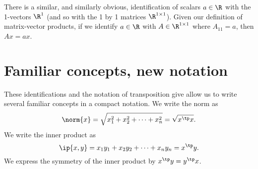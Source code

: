There is a similar, and similarly obvious, identification of scalars $a \in \R$ with the 1-vectors $\R ^{1}$ (and so with the 1 by 1 matrices $\R ^{1 \times  1}$).
Given our definition of matrix-vector products, if we identify $a \in \R $ with $A \in \R^{1 \times  1}$ where $A_{11} = a$, then $Ax = ax$.

\section*{Familiar concepts, new notation}

These identifications and the notation of transposition give allow us to write several familiar concepts in a compact notation.
We write the norm as
  \[
\norm{x} = \sqrt{x_1^2 + x_2^2 + \cdots + x_n^2} = \sqrt{x^\tp x}.
  \]
We write the inner product as
  \[
\ip{x,y} =
x_1y_1 + x_2y_2 + \cdots + x_ny_n
= x^\tp y.
  \]
We express the symmetry of the inner product by $ x^\tp y = y^\tp x$.
